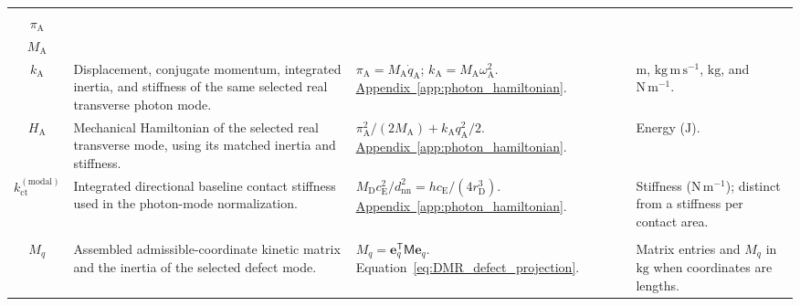 \begin{longtable}{@{} c p{5.5cm} p{4cm} p{3.5cm} @{}}
\begin{tabular}[c]{@{}c@{}}$q_{\mathrm A}$ \\ $\pi_{\mathrm A}$ \\ $M_{\mathrm A}$ \\ $k_{\mathrm A}$\end{tabular} & {\raggedright Displacement, conjugate momentum, integrated inertia, and stiffness of the same selected real transverse photon mode.\par} & {\raggedright $\pi_{\mathrm A}=M_{\mathrm A}\dot q_{\mathrm A}$; $k_{\mathrm A}=M_{\mathrm A}\omega_{\mathrm A}^2$. \newline \hyperref[app:photon_hamiltonian]{Appendix~\ref*{app:photon_hamiltonian}}.\par} & {\raggedright $\mathrm m$, $\mathrm{kg\,m\,s^{-1}}$, $\mathrm{kg}$, and $\mathrm{N\,m^{-1}}$.\par} \\

$H_{\mathrm A}$ & {\raggedright Mechanical Hamiltonian of the selected real transverse mode, using its matched inertia and stiffness.\par} & {\raggedright $\pi_{\mathrm A}^2/(2M_{\mathrm A})+k_{\mathrm A}q_{\mathrm A}^2/2$. \newline \hyperref[app:photon_hamiltonian]{Appendix~\ref*{app:photon_hamiltonian}}.\par} & {\raggedright Energy ($\mathrm J$).\par} \\

$k_{\mathrm{ct}}^{(\mathrm{modal})}$ & {\raggedright Integrated directional baseline contact stiffness used in the photon-mode normalization.\par} & {\raggedright $M_{\mathrm D}c_{\mathrm E}^2/d_{\mathrm{nn}}^2=hc_{\mathrm E}/(4r_{\mathrm D}^3)$. \newline \hyperref[app:photon_hamiltonian]{Appendix~\ref*{app:photon_hamiltonian}}.\par} & {\raggedright Stiffness ($\mathrm{N\,m^{-1}}$); distinct from a stiffness per contact area.\par} \\


\begin{tabular}[c]{@{}c@{}}$\mathsf M$ \\ $M_q$\end{tabular} & {\raggedright Assembled admissible-coordinate kinetic matrix and the inertia of the selected defect mode.\par} & {\raggedright $M_q=\mathbf e_q^{\mathsf T}\mathsf M\mathbf e_q$. \newline Equation~\eqref{eq:DMR_defect_projection}.\par} & {\raggedright Matrix entries and $M_q$ in $\mathrm{kg}$ when coordinates are lengths.\par} \\


\end{longtable}
